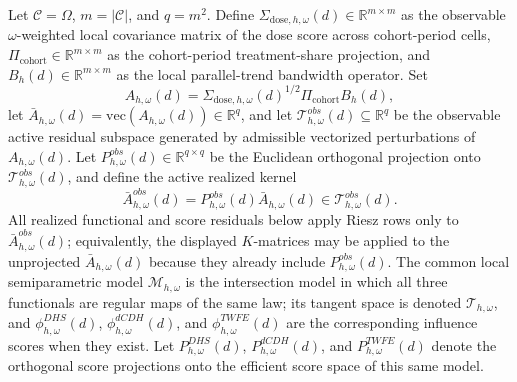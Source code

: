 \documentclass[11pt]{article}
\theoremstyle{definition}
\theoremstyle{plain}
\theoremstyle{remark}
\begin{document}
Let \(\mathcal C=\Omega\), \(m=|\mathcal C|\), and \(q=m^2\). Define \(\Sigma_{\mathrm{dose},h,\omega}(d)\in\mathbb R^{m\times m}\) as the observable \(\omega\)-weighted local covariance matrix of the dose score across cohort-period cells, \(\Pi_{\mathrm{cohort}}\in\mathbb R^{m\times m}\) as the cohort-period treatment-share projection, and \(B_h(d)\in\mathbb R^{m\times m}\) as the local parallel-trend bandwidth operator. Set
\[
  A_{h,\omega}(d)=\Sigma_{\mathrm{dose},h,\omega}(d)^{1/2}\Pi_{\mathrm{cohort}}B_h(d),
\]
let \(\bar A_{h,\omega}(d)=\mathrm{vec}(A_{h,\omega}(d))\in\mathbb R^q\), and let \(\mathcal T^{obs}_{h,\omega}(d)\subseteq\mathbb R^q\) be the observable active residual subspace generated by admissible vectorized perturbations of \(A_{h,\omega}(d)\). Let \(P^{obs}_{h,\omega}(d)\in\mathbb R^{q\times q}\) be the Euclidean orthogonal projection onto \(\mathcal T^{obs}_{h,\omega}(d)\), and define the active realized kernel
\[
  \bar A^{obs}_{h,\omega}(d)=P^{obs}_{h,\omega}(d)\bar A_{h,\omega}(d)\in\mathcal T^{obs}_{h,\omega}(d).
\]
All realized functional and score residuals below apply Riesz rows only to \(\bar A^{obs}_{h,\omega}(d)\); equivalently, the displayed \(K\)-matrices may be applied to the unprojected \(\bar A_{h,\omega}(d)\) because they already include \(P^{obs}_{h,\omega}(d)\). The common local semiparametric model \(\mathcal M_{h,\omega}\) is the intersection model in which all three functionals are regular maps of the same law; its tangent space is denoted \(\mathcal T_{h,\omega}\), and \(\phi^{DHS}_{h,\omega}(d)\), \(\phi^{dCDH}_{h,\omega}(d)\), and \(\phi^{TWFE}_{h,\omega}(d)\) are the corresponding influence scores when they exist. Let \(P^{DHS}_{h,\omega}(d)\), \(P^{dCDH}_{h,\omega}(d)\), and \(P^{TWFE}_{h,\omega}(d)\) denote the orthogonal score projections onto the efficient score space of this same model.
\end{document}
